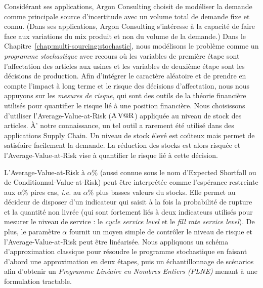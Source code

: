 Considérant ses applications, Argon Consulting choisit de modéliser la demande comme principale source d'incertitude avec un volume total de demande fixe et connu.
(Dans ses applications, Argon Consulting s'intéresse à la capacité de faire face aux variations du mix produit et non du volume de la demande.)
Dans le Chapitre~\ref{chap:multi-sourcing:stochastic}, nous modélisons le problème comme un \emph{programme stochastique} avec recours où les variables de première étape sont l'affectation des articles aux usines et les variables de deuxième étape sont les décisions de production.
Afin d'intégrer le caractère aléatoire et de prendre en compte l'impact à long terme et le risque des décisions d'affectation, nous nous appuyons sur les \emph{mesures de risque}, qui sont des outils de la théorie financière utilisés pour quantifier le risque lié à une position financière.
Nous choisissons d'utiliser l'Average-Value-at-Risk ($\operatorname{A\operatorname{V@R}}$) appliquée au niveau de stock des articles.
\`A' notre connaissance, un tel outil a rarement été utilisé dans des applications Supply Chain.
Un niveau de stock élevé est coûteux mais permet de satisfaire facilement la demande.
La réduction des stocks est alors risquée et l'Average-Value-at-Risk vise à quantifier le risque lié à cette décision.


L'Average-Value-at-Risk à $\alpha\%$ (aussi connue sous le nom d'Expected Shortfall ou de Conditionnal-Value-at-Risk) peut être interprétée comme l'espérance restreinte aux $\alpha\%$ pires cas, \emph{i.e.} au $\alpha\%$ plus basses valeurs du stocks.
Elle permet au décideur de disposer d'un indicateur qui saisit à la fois la probabilité de rupture et la quantité non livrée (qui sont fortement liés à deux indicateurs utilisés pour mesurer le niveau de service : le \emph{cycle service level} et le \emph{fill rate service level}).
De plus, le paramètre $\alpha$ fournit un moyen simple de contrôler le niveau de risque et l'Average-Value-at-Risk peut être linéarisée.
Nous appliquons un schéma d'approximation classique pour résoudre le programme stochastique en faisant d'abord une approximation en deux étapes, puis un échantillonnage de scénarios afin d'obtenir un \emph{Programme Linéaire en Nombres Entiers (PLNE)} menant à une formulation tractable.


\medskip


